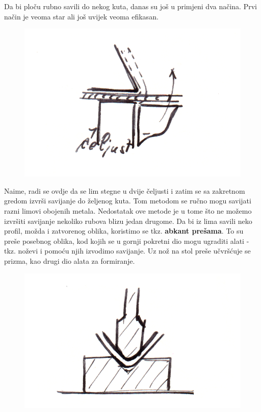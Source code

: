 \documentclass[a4paper,12pt]{article}
\numberwithin{figure}{section}
\begin{document}
\begin{enumerate}
\begin{figure}[!h]
\end{figure}
\FloatBarrier
\end{enumerate}
Da bi ploču rubno savili do nekog kuta, danas su još u primjeni dva načina. Prvi način je veoma star ali još uvijek veoma efikasan.
\begin{figure}[!h]
\centering
\includegraphics[scale=0.15]{image_48-3.png}
\end{figure}
\FloatBarrier
Naime, radi se ovdje da se lim stegne u dvije čeljusti i zatim se sa zakretnom gredom izvrši savijanje do željenog kuta. Tom metodom se ručno mogu savijati razni limovi obojenih metala. Nedostatak ove metode je u tome što ne možemo izvršiti savijanje nekoliko rubova blizu jedan drugome. Da bi iz lima savili neko profil, možda i zatvorenog oblika, koristimo se tkz. \textbf{abkant prešama}. To su preše posebnog oblika, kod kojih se u gornji pokretni dio mogu ugraditi alati - tkz. noževi i pomoću njih izvodimo savijanje. Uz nož na stol preše učvršćuje se prizma, kao drugi dio alata za formiranje. 
\begin{figure}[!h]
\centering
\includegraphics[scale=0.15]{image_49-1.png}
\end{figure}
\end{document}
